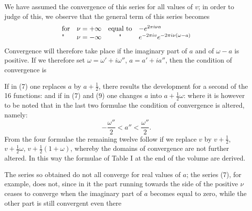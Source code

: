 We have assumed the convergence of this series for all values of $v$;
in order to judge of this, we observe that the general term of this
 series becomes
\[
\begin{array}{lccl}
\text{for} & \nu = +\infty & \text{equal to} & -e^{2\pi i\nu a}\\
\text{\textquotedbl} & \nu = -\infty & \text{\textquotedbl} & e^{-2\pi iv}e^{-2\pi i\nu(\omega-a)}
\end{array}
\]
Convergence will therefore take place if the imaginary
part of $a$ and of $\omega - a$ is positive. If we therefore set
$\omega = \omega' + i\omega''$, $a = a' + ia''$, then the condition of convergence is

If in (7) one replaces $a$ by $a + \frac{1}{2}$, there results the
development for a second of the 16 functions:
and if in (7) and (9) one changes $a$ into $a + \frac{1}{2}\omega$:
where it is however to be noted that in the last two formulae
the condition of convergence is altered, namely:
\[
-\frac{\omega''}{2} < a'' < \frac{\omega''}{2}.
\]
From the four formulae the remaining twelve follow if we
replace $v$ by $v + \frac{1}{2}$, $v + \frac{1}{2}\omega$, $v + \frac{1}{2}(1+\omega)$, whereby the
domains of convergence are not further altered. In this way
the formulae of Table I at the end of the volume are derived.

The series so obtained do not all converge for real values
of $a$; the series (7), for example, does not, since in it the part
running towards the side of the positive $\nu$
ceases to converge when the imaginary part of $a$ becomes equal
to zero, while the other part is still convergent even there
